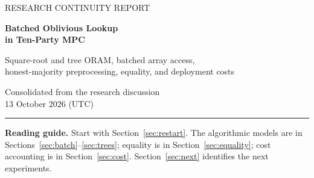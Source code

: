 \documentclass[11pt]{article}
\begin{document}
\hypersetup{pageanchor=false}
\begin{titlepage}
\thispagestyle{empty}
\vspace*{0.6in}
{\color{teal}\large RESEARCH CONTINUITY REPORT\par}
\vspace{0.22in}
{\color{navy}\Huge\bfseries Batched Oblivious Lookup\\[7pt] in Ten-Party MPC\par}
\vspace{0.28in}
{\Large Square-root and tree ORAM, batched array access,\\[4pt]
honest-majority preprocessing, equality, and deployment costs\par}
\vspace{0.38in}
{\large Consolidated from the research discussion\\13 October 2026 (UTC)\par}
\vspace{0.42in}
\rule{\textwidth}{0.6pt}
\begin{abstract}
\noindent This report preserves the problem statement, candidate constructions,
literature, derivations, corrections, and unresolved questions from a discussion
of a database containing $2^{28}$ pairs of 32-byte keys and 32-byte values.
The target is 10,000 read requests per second across ten MPC parties, using
batches of approximately 1,024 requests and parallel workers. The security
assumption evolved from conventional SPDZ-style dishonest-majority computation
to allowing an honest majority. Degree-4 Shamir sharing among ten parties is
therefore the main arithmetic representation considered here.

The central research direction is to combine efficient batched private array
access with an enlarged square-root ORAM shelter and a shallow recursive
position map. The report derives when this could outperform a direct batched
scan, explains why compaction alone is insufficient, and records tree-based
alternatives. It also gives explicit equality protocols and a conditional AWS
cost model. No complete ten-party ORAM implementation or end-to-end throughput
measurement was produced in the discussion. Numerical projections must retain
their stated assumptions.
\end{abstract}
\vfill
\textbf{Reading guide.} Start with Section~\ref{sec:restart}. The algorithmic
models are in Sections~\ref{sec:batch}--\ref{sec:trees}; equality is in
Section~\ref{sec:equality}; cost accounting is in Section~\ref{sec:cost}.
Section~\ref{sec:next} identifies the next experiments.
\end{titlepage}
\end{document}
